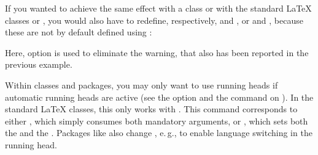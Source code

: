 \begin{Example}
      If you wanted to achieve the same effect with a \KOMAScript{} class or 
      with the standard \LaTeX{} classes  or , you 
      would also have to redefine, respectively,
       and
      , or
       and
      , because
      these are not by default defined using :
      Here, option  is used to eliminate
      the  warning, that also has been reported in the previous example.%
    \end{Example}
  \fi%
  \EndIndexGroup
\fi


  \begin{Declaration}
  \end{Declaration}
  Within classes and packages, you may only want to use running heads if
  automatic running heads are active (see the
   option and the
   command on
  ). In the standard \LaTeX{}
  classes, this only works with . This command corresponds to
  either , which simply consumes both mandatory arguments, 
  or , which sets both the  
  and the . Packages like  also change 
  \Macro{\@mkboth}, e.\,g., to enable language switching in the running head.

